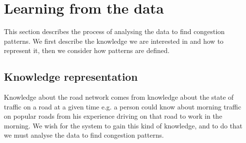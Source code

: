 \section{Learning from the data}
This section describes the process of analysing the data to find congestion patterns. We first describe the knowledge we are interested in and how to represent it, then we consider how patterns are defined.

\subsection{Knowledge representation}
Knowledge about the road network comes from knowledge about the state of traffic on a road at a given time e.g. a  person could know about morning traffic on popular roads from his experience driving on that road to work in the morning. We wish for the system to gain this kind of knowledge, and to do that we must analyse the data to find congestion patterns.
